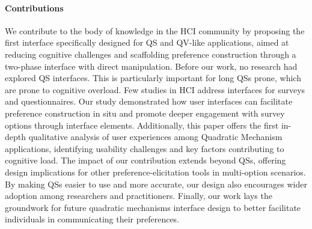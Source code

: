 \paragraph{Contributions}
We contribute to the body of knowledge in the HCI community by proposing the first interface specifically designed for QS and QV-like applications, aimed at reducing cognitive challenges and scaffolding preference construction through a two-phase interface with direct manipulation. Before our work, no research had explored QS interfaces. This is particularly important for long QSs prone, which are prone to cognitive overload. Few studies in HCI address interfaces for surveys and questionnaires. Our study demonstrated how user interfaces can facilitate preference construction in situ and promote deeper engagement with survey options through interface elements. Additionally, this paper offers the first in-depth qualitative analysis of user experiences among Quadratic Mechanism applications, identifying usability challenges and key factors contributing to cognitive load. The impact of our contribution extends beyond QSs, offering design implications for other preference-elicitation tools in multi-option scenarios. By making QSs easier to use and more accurate, our design also encourages wider adoption among researchers and practitioners. Finally, our work lays the groundwork for future quadratic mechanisms interface design to better facilitate individuals in communicating their preferences.